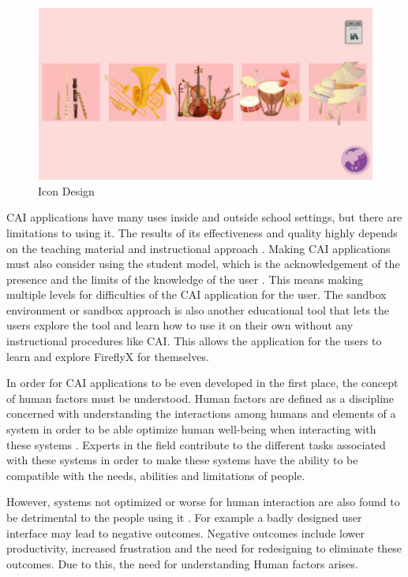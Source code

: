 \begin{figure}[H]
    \centering
    \includegraphics{figures/chung_icons.PNG}
    \caption{Icon Design \protect\cite{chung2017designing}}
    \label{fig:ICON_DES}
\end{figure}

CAI applications have many uses inside and outside school settings, but there are limitations to using it. The results of its effectiveness and quality highly depends on the teaching material and instructional approach \cite{aqda2011comparative}. Making CAI applications must also consider using the student model, which is the acknowledgement of the presence and the limits of the knowledge of the user \cite{self1974student}. This means making multiple levels for difficulties of the CAI application for the user. The sandbox environment or sandbox approach is also another educational tool that lets the users explore the tool and learn how to use it on their own without any instructional procedures like CAI. This allows the application for the users to learn and explore FireflyX for themselves.

In order for CAI applications to be even developed in the first place, the concept of human factors must be understood. Human factors are defined as a discipline concerned with understanding the interactions among humans and elements of a system in order to be able optimize human well-being when interacting with these systems \cite{salvendy2012handbook}. Experts in the field contribute to the different tasks associated with these systems in order to make these systems have the ability to be compatible with the needs, abilities and limitations of people. 

However, systems not optimized or worse for human interaction are also found to be detrimental to the people using it \cite{foley1984human}. For example a badly designed user interface may lead to negative outcomes. Negative outcomes include lower productivity, increased frustration and the need for redesigning to eliminate these outcomes. Due to this, the need for understanding Human factors arises.

